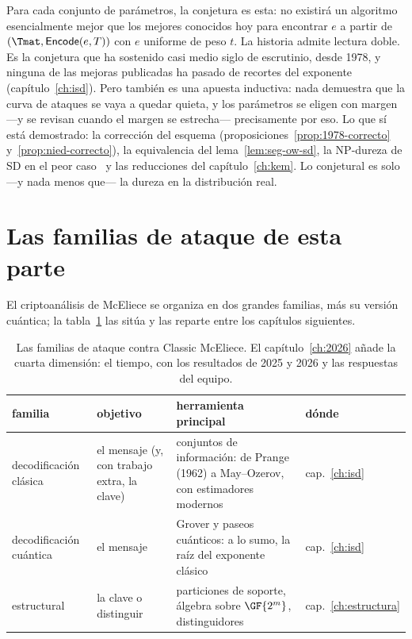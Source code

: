 \begin{rigor}
Para cada conjunto de parámetros, la conjetura es esta: no existirá
un algoritmo esencialmente mejor que los mejores conocidos hoy para
encontrar $e$ a partir de $(\Tmat,\textsf{Encode}(e,T))$ con $e$
uniforme de peso $t$. La historia admite lectura doble. Es la
conjetura que ha sostenido casi medio siglo de escrutinio, desde
1978, y ninguna de las mejoras publicadas ha pasado de recortes del
exponente (capítulo~\ref{ch:isd}). Pero también es una apuesta
inductiva: nada demuestra que la curva de ataques se vaya a quedar
quieta, y los parámetros se eligen con margen ---y se revisan cuando
el margen se estrecha--- precisamente por eso. Lo que sí está
demostrado: la corrección del esquema
(proposiciones~\ref{prop:1978-correcto} y~\ref{prop:nied-correcto}),
la equivalencia del lema~\ref{lem:seg-ow-sd}, la NP-dureza de SD en
el peor caso~\cite{bcmv1978} y las reducciones del
capítulo~\ref{ch:kem}. Lo conjetural es solo ---y nada menos que---
la dureza en la distribución real.
\end{rigor}

\section{Las familias de ataque de esta parte}

El criptoanálisis de McEliece se organiza en dos grandes familias,
más su versión cuántica; la tabla~\ref{tab:seg-familias} las sitúa y
las reparte entre los capítulos siguientes.

\begin{table}[htbp]
\centering
\small
\setlength{\tabcolsep}{6pt}
\begin{tabular}{@{}p{3.2cm}p{3.4cm}p{7.0cm}l@{}}
\toprule
familia & objetivo & herramienta principal & dónde\\
\midrule
decodificación clásica & el mensaje (y, con trabajo extra, la
clave) & conjuntos de información: de Prange (1962) a May--Ozerov,
con estimadores modernos & cap.~\ref{ch:isd}\\
decodificación cuántica & el mensaje & Grover y paseos cuánticos: a
lo sumo, la raíz del exponente clásico & cap.~\ref{ch:isd}\\
estructural & la clave o distinguir & particiones de soporte,
álgebra sobre $\GF{2^m}$, distinguidores & cap.~\ref{ch:estructura}\\
\bottomrule
\end{tabular}
\caption{Las familias de ataque contra Classic McEliece. El
capítulo~\ref{ch:2026} añade la cuarta dimensión: el tiempo, con los
resultados de 2025 y 2026 y las respuestas del equipo.}
\label{tab:seg-familias}
\end{table}

